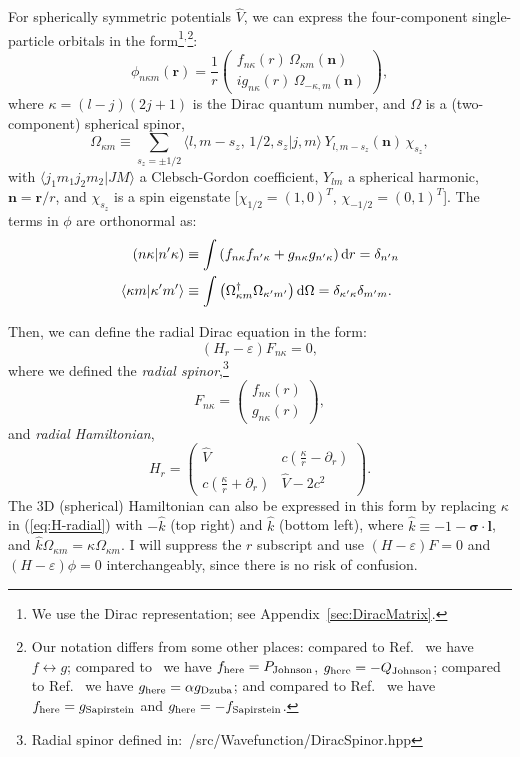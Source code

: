 \documentclass[10pt,twocolumn,a4paper]{article}%
\newcommand{\braket}[1]{\ensuremath{\langle #1\rangle}}	%
\newcommand{\matr}[4]{\ensuremath{\begin{pmatrix}#1&#2\\#3&#4\end{pmatrix}}}	%
\newcommand{\twocomp}[2]{\ensuremath{\begin{pmatrix}#1\\#2\end{pmatrix}}}	%
\renewcommand{\v}[1]{\ensuremath{\boldsymbol{#1}}}		%
\newcommand{\be}{\begin{equation}}
\newcommand{\ee}{\end{equation}}
\def\d{\ensuremath{{\rm d}}}
\def\en{\ensuremath{\varepsilon}}
\def\p{\ensuremath{\partial}}
\newcommand{\s}{\ensuremath{\sigma}}
\renewcommand{\k}{\ensuremath{\kappa}}
\begin{document}
For spherically symmetric potentials $\hat V$, we can express the four-component single-particle orbitals in the form\footnote{We use the Dirac representation; see Appendix~\ref{sec:DiracMatrix}.}$^,$\footnote{Our notation differs from some other places: compared to Ref.~\cite{BetheBook} we have $f\leftrightarrow g$;
compared to~\cite{JohnsonBook2007} we have $f_{\rm here}= P_{\rm Johnson}$, $g_{\rm here}= -Q_{\rm Johnson}$; compared to Ref.~\cite{Dzuba1982a} we have $g_{\rm here} = \alpha g_{\rm Dzuba}$; and compared to Ref.~\cite{Sapirstein1998} we have $f_{\rm here} = g_{\rm Sapirstein}$ and $g_{\rm here}=-f_{\rm Sapirstein}$.}:
\be\label{eq:phi-orbital}
\phi_{n\k m}(\v{r}) = \frac{1}{r}\twocomp
{f_{n\k}(r)\,\Omega_{\k m}(\v{n})}
{ig_{n\k}(r)\,\Omega_{-\k ,m}(\v{n})},
\ee
where $\k = (l-j)(2j+1)$ is the Dirac quantum number,
and $\Omega$ is a (two-component) spherical spinor,
\be
\Omega_{\k m} \equiv \sum_{s_z=\pm1/2} \braket{l,m-s_z ,\,1/2,s_z|j,m}\,Y_{l,m-s_z}(\v{n})\,\chi_{s_z},
\ee
with $\braket{j_1 m_1 j_2 m_2|JM}$ a Clebsch-Gordon coefficient, $Y_{lm}$ a spherical harmonic, $\v{n} = \v{r}/r$, and $\chi_{s_z}$ is a spin eigenstate [$\chi_{1/2}=(1,0)^T$, $\chi_{-1/2}=(0,1)^T$].
The terms in $\phi$ are orthonormal as: 
\begin{align}\label{eq:ffrad}
\left(n\k|n'\k\right)&\equiv\int\left(f_{n\k}f_{n'\k}+g_{n\k}g_{n'\k}\right)\d r = \delta_{n'n}\\
\braket{\k m|\k'm'}&\equiv\int\left(\Omega_{\k m}^\dag\Omega_{\k' m'}\right)\d \Omega = \delta_{\k'\k}\delta_{m'm}.
\end{align}


Then, we can define the radial Dirac equation in the form: 
\be\label{eq:Dirac-radial}
\left(H_r - \en\right)F_{n\k} = 0,
\ee
where we defined the {\em radial spinor},\footnote{Radial spinor defined in:~/src/Wavefunction/DiracSpinor.hpp}
\be\label{eq:F-radial}
F_{n\k} =\twocomp {f_{n\k}(r)}{g_{n\k}(r)},
\ee
and {\em radial Hamiltonian},
\be\label{eq:H-radial}
H_r = \matr 	{\hat V} 				{c(\frac{\k}{r}-\p_r )}
			{c(\frac{\k}{r} + \p_r  )}	{\hat V-2c^2}.
\ee
The 3D (spherical) Hamiltonian can also be expressed in this form by replacing $\k$ in (\ref{eq:H-radial}) with $-\hat k$ (top right) and $\hat k$ (bottom left), where $\hat k \equiv -1 - \v{\s}\cdot\v{l}$,  and $\hat k\Omega_{\k m} = \k\Omega_{\k m}$.
I will suppress the $r$ subscript and use
$\left(H - \en\right)F = 0$ and $\left(H - \en\right)\phi = 0$ interchangeably, since there is no risk of confusion.\\
\end{document}
